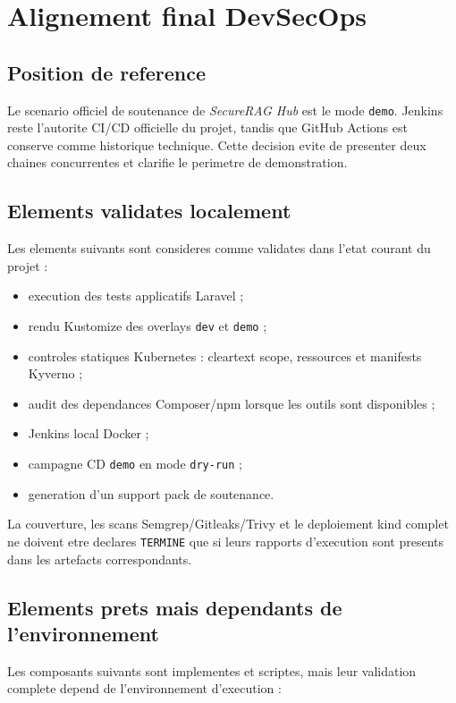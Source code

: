 \section{Alignement final DevSecOps}

\subsection{Position de reference}

Le scenario officiel de soutenance de \textit{SecureRAG Hub} est le mode
\texttt{demo}. Jenkins reste l'autorite CI/CD officielle du projet, tandis que
GitHub Actions est conserve comme historique technique. Cette decision evite de
presenter deux chaines concurrentes et clarifie le perimetre de demonstration.

\subsection{Elements validates localement}

Les elements suivants sont consideres comme validates dans l'etat courant du
projet :

\begin{itemize}
  \item execution des tests applicatifs Laravel ;
  \item rendu Kustomize des overlays \texttt{dev} et \texttt{demo} ;
  \item controles statiques Kubernetes : cleartext scope, ressources et manifests Kyverno ;
  \item audit des dependances Composer/npm lorsque les outils sont disponibles ;
  \item Jenkins local Docker ;
  \item campagne CD \texttt{demo} en mode \texttt{dry-run} ;
  \item generation d'un support pack de soutenance.
\end{itemize}

La couverture, les scans Semgrep/Gitleaks/Trivy et le deploiement kind complet
ne doivent etre declares \texttt{TERMINE} que si leurs rapports d'execution
sont presents dans les artefacts correspondants.

\subsection{Elements prets mais dependants de l'environnement}

Les composants suivants sont implementes et scriptes, mais leur validation
complete depend de l'environnement d'execution :

